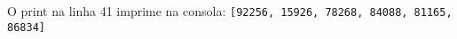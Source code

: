 \documentclass[12pt,varwidth=16cm,border=1pt]{standalone}
\begin{document}
O print na linha 41 imprime na consola:
\newline
\verb+[92256, 15926, 78268, 84088, 81165, 86834]+
\end{document}
